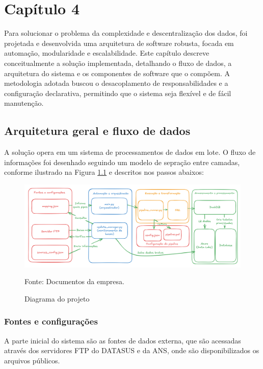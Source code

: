 \chapter{Capítulo 4}

Para solucionar o problema da complexidade e descentralização dos dados, foi projetada e desenvolvida uma arquitetura de software robusta, focada em automação, modularidade e escalabilidade. Este capítulo descreve conceitualmente a solução implementada, detalhando o fluxo de dados, a arquitetura do sistema e os componentes de software que o compõem. A metodologia adotada buscou o desacoplamento de responsabilidades e a configuração declarativa, permitindo que o sistema seja flexível e de fácil manutenção.

\section{Arquitetura geral e fluxo de dados}

A solução opera em um sistema de processamentos de dados em lote. O fluxo de informações foi desenhado seguindo um modelo de sepração entre camadas, conforme ilustrado na Figura \ref{fig:diagrama} e descritos nos passos abaixos: 

\begin{figure}[H]
  \centering
  \caption{Diagrama do projeto}\label{fig:diagrama}
  \includegraphics[width=1\linewidth]{imagens/diagrama.png}
  \par
  \footnotesize{Fonte: Documentos da empresa.}
\end{figure}

\subsection{Fontes e configurações}

A parte inicial do sistema são as fontes de dados externa, que são acessadas através dos servidores FTP do DATASUS e da ANS, onde são disponibilizados os arquivos públicos.

